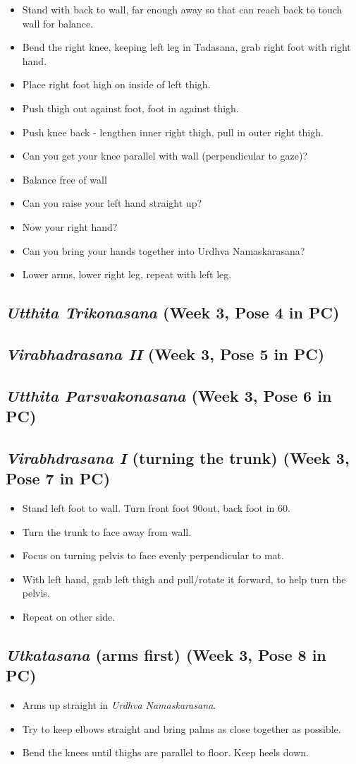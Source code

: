 \documentclass{book}
\newcommand{\apose}[1]{\emph{#1}}
\newcommand{\urdnam}{\apose{Urdhva Namaskarasana}}
\newcommand{\utka}{\apose{Utkatasana}}
\newcommand{\uttparsva}{\apose{Utthita Parsvakonasana}}
\newcommand{\utttrik}{\apose{Utthita Trikonasana}}
\newcommand{\virai}{\apose{Virabhdrasana I}}
\newcommand{\viraii}{\apose{Virabhadrasana II}}
\newcommand{\PC}[2]{{\normalfont \hfill(Week #1, Pose #2 in PC)}}
\newcommand{\newpose}[1]{{{#1}}}
\newcounter{pose}
\newcommand{\pose}{\subsection}
\begin{document}
  \begin{itemize}
  \item Stand with back to wall, far enough away so that can reach
    back to touch wall for balance.
  \item Bend the right knee, keeping left leg in Tadasana, grab right
    foot with right hand.
  \item Place right foot high on inside of left thigh.
  \item Push thigh out against foot, foot in against thigh.
  \item Push knee back - lengthen inner right thigh, pull in outer
    right thigh. 
  \item Can you get your knee parallel with wall (perpendicular to
    gaze)? 
  \item Balance free of wall
  \item Can you raise your left hand straight up?
  \item Now your right hand?
  \item Can you bring your hands together into Urdhva Namaskarasana?
  \item Lower arms, lower right leg, repeat with left leg.
  \end{itemize}

\pose{ \utttrik{} \PC{3}{4}}

\pose{ \viraii{} \PC{3}{5}}

\pose{ \uttparsva{} \PC{3}{6}}

\pose{ \newpose{\virai} (turning the trunk) \PC{3}{7}}

  \begin{itemize}
  \item Stand left foot to wall. Turn front foot 90\textdegree out,
    back foot in 60\textdegree. 
  \item Turn the trunk to face away from wall.
  \item Focus on turning pelvis to face evenly perpendicular to mat. 
  \item With left hand, grab left thigh and pull/rotate it forward, to
    help turn the pelvis. 
  \item Repeat on other side.
  \end{itemize}

\pose{ \newpose{\utka{}} (arms first) \PC{3}{8}}

  \begin{itemize}
  \item Arms up straight in \urdnam{}.
  \item Try to keep elbows straight and bring palms as close together
    as possible. 
  \item Bend the knees until thighs are parallel to floor. Keep heels
    down. 
  \end{itemize}
\end{document}
